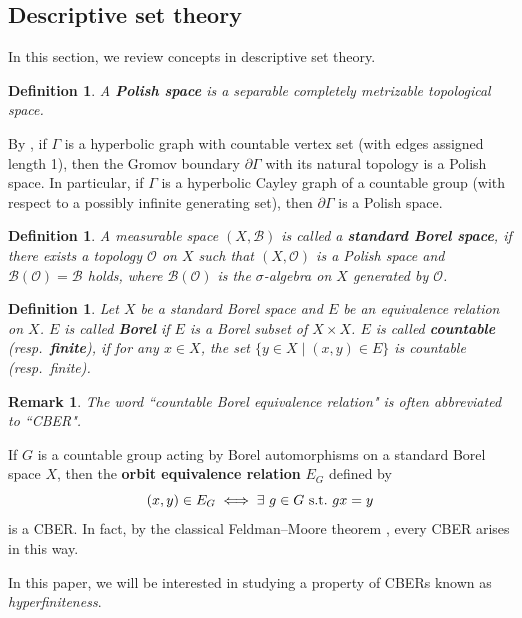 \documentclass{article}[11pt]
\newtheorem{defn}[thm]{Definition}
\newtheorem{rem}[thm]{Remark}
\begin{document}
{\subsection{Descriptive set theory}

In this section, we review concepts in descriptive set theory.

\begin{defn}\label{def:Polish}
    A \textbf{Polish space} is a separable completely metrizable topological space.
\end{defn}

By \cite[Lemma 4.1]{MR4715159}, if $\Gamma$ is a hyperbolic graph with countable vertex set (with edges assigned length 1), then the Gromov boundary $\partial \Gamma$ with its natural topology is a Polish space. In particular, if $\Gamma$ is a hyperbolic Cayley graph of a countable group (with respect to a possibly infinite generating set), then $\partial \Gamma$ is a Polish space. 

\begin{defn}
    A measurable space $(X,\mathcal{B})$ is called a \textbf{standard Borel space}, if there exists a topology $\mathcal{O}$ on $X$ such that $(X,\mathcal{O})$ is a Polish space and $\mathcal{B}(\mathcal{O})=\mathcal{B}$ holds, where $\mathcal{B}(\mathcal{O})$ is the $\sigma$-algebra on $X$ generated by $\mathcal{O}$.
\end{defn}

\begin{defn}
    Let $X$ be a standard Borel space and $E$ be an equivalence relation on $X$. $E$ is called \textbf{Borel} if $E$ is a Borel subset of $X\times X$. $E$ is called \textbf{countable} (resp.\ \textbf{finite}), if for any $x\in X$, the set $\{ y\in X \mid (x,y)\in E \}$ is countable (resp.\ finite).
\end{defn}

\begin{rem}
    The word ``countable Borel equivalence relation" is often abbreviated to ``CBER".
\end{rem}

If $G$ is a countable group acting by Borel automorphisms on a standard Borel space $X$, then the \textbf{orbit equivalence relation} $E_G$ defined by
     \[
        (x,y) \in E_G \iff \exists\ g\in G {\rm ~s.t.~} gx=y
     \]
is a CBER. In fact, by the classical Feldman--Moore theorem \cite[Theorem 1.3]{KM04}, every CBER arises in this way. 

In this paper, we will be interested in studying a property of CBERs known as \emph{hyperfiniteness}. 

}
\end{document}
